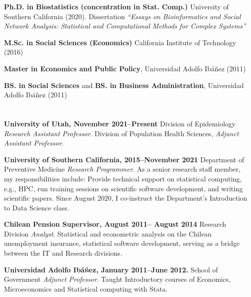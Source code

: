 \documentclass[letterpaper, 10pt]{article}
\newcommand{\myorange}{myteal!70!black}
\newcommand{\darkorange}{\myorange !50!black}
\renewcommand{\bf}{\bfseries\color{\myorange}}
\renewcommand{\textbf}[1]{{\bfseries\color{\myorange}#1}}
\renewenvironment{itemize}{
  \begin{list}{}{
    \setlength{\leftmargin}{0.45cm}
  }
}{
  \end{list}
}
\begin{document}
\begin{itemize}
\item 
{\bf Ph.D. in Biostatistics (concentration in Stat. Comp.)} University of Southern California (2020). Dissertation \emph{``Essays on Bioinformatics and Social Network Analysis: Statistical and Computational Methods for Complex Systems''}

{\bf M.Sc. in Social Sciences (Economics)} California Institute of Technology (2016)

{\bf Master in Economics and Public Policy}, Universidad Adolfo Ib\'a\~nez (2011)

{\bf BS. in Social Sciences} and {\bf BS. in Business Administration}, Universidad Adolfo Ib\'a\~nez (2011)
\end{itemize}

\section*{\color{\darkorange}{Professional Experience}}

\begin{itemize}
\item \textbf{University of Utah, November 2021--Present} Division of Epidemiology \emph{Research Assistant Professor}. Division of Population Health Sciences, \emph{Adjunct Assistant Professor}.
\item \textbf{University of Southern California, 2015--November 2021} Department of Preventive Medicine \emph{Research Programmer}. As a senior research staff member, my responsibilities include: Provide technical support on statistical computing, e.g., HPC, run training sessions on scientific software development, and writing scientific papers. Since August 2020, I co-instruct the Department's Introduction to Data Science class.
\item \textbf{Chilean Pension Supervisor, August 2011-- August 2014} Research Division \emph{Analyst}. Statistical and econometric analysis on the Chilean unemployment insurance, statistical software development, serving as a bridge between the IT and Research divisions.
\item \textbf{Universidad Adolfo Ib\'a\~nez, January 2011--June 2012.} School of Government \emph{Adjunct Professor}.
Taught Introductory courses of Economics, Microeconomics and Statistical computing with Stata.
\end{itemize}

\section*{\color{\darkorange}{Software {\small (selected)}}}
\end{document}
